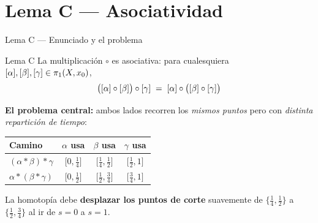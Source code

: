 \section{Lema C — Asociatividad}

\begin{frame}{Lema C — Enunciado y el problema}
  \begin{block}{Lema C}
    La multiplicación $\circ$ es asociativa: para cualesquiera
    $[\alpha], [\beta], [\gamma] \in \pi_1(X,x_0)$,
    \[
      \bigl([\alpha] \circ [\beta]\bigr) \circ [\gamma]
      \;=\;
      [\alpha] \circ \bigl([\beta] \circ [\gamma]\bigr)
    \]
  \end{block}

  \bigskip
  \textbf{El problema central:} ambos lados recorren los \emph{mismos puntos}
  pero con \emph{distinta repartición de tiempo}:

  \bigskip
  \begin{center}
  \begin{tabular}{lccc}
    \toprule
    Camino & $\alpha$ usa & $\beta$ usa & $\gamma$ usa \\
    \midrule
    $(\alpha*\beta)*\gamma$ &
      $\bigl[0,\tfrac{1}{4}\bigr]$ &
      $\bigl[\tfrac{1}{4},\tfrac{1}{2}\bigr]$ &
      $\bigl[\tfrac{1}{2},1\bigr]$ \\[4pt]
    $\alpha*(\beta*\gamma)$ &
      $\bigl[0,\tfrac{1}{2}\bigr]$ &
      $\bigl[\tfrac{1}{2},\tfrac{3}{4}\bigr]$ &
      $\bigl[\tfrac{3}{4},1\bigr]$ \\
    \bottomrule
  \end{tabular}
  \end{center}

  \bigskip
  La homotopía debe \textbf{desplazar los puntos de corte} suavemente de
  $\bigl\{\tfrac{1}{4},\tfrac{1}{2}\bigr\}$ a $\bigl\{\tfrac{1}{2},\tfrac{3}{4}\bigr\}$
  al ir de $s=0$ a $s=1$.
\end{frame}

